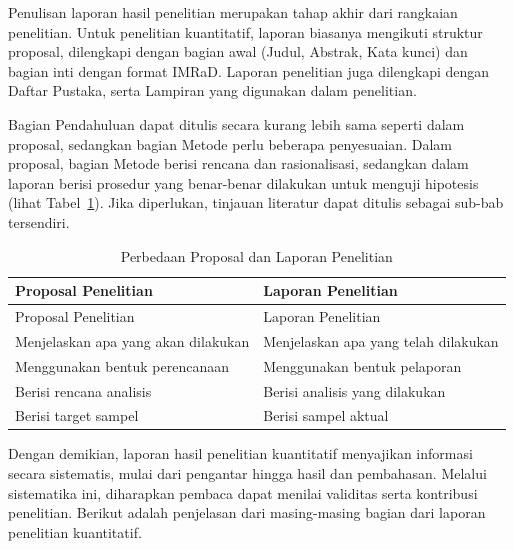 \documentclass[
  indonesian,
  letterpaper,
  DIV=11,
  numbers=noendperiod]{scrreprt}
\begin{document}
Penulisan laporan hasil penelitian merupakan tahap akhir dari rangkaian
penelitian. Untuk penelitian kuantitatif, laporan biasanya mengikuti
struktur proposal, dilengkapi dengan bagian awal (Judul, Abstrak, Kata
kunci) dan bagian inti dengan format IMRaD. Laporan penelitian juga
dilengkapi dengan Daftar Pustaka, serta Lampiran yang digunakan dalam
penelitian.

Bagian Pendahuluan dapat ditulis secara kurang lebih sama seperti dalam
proposal, sedangkan bagian Metode perlu beberapa penyesuaian. Dalam
proposal, bagian Metode berisi rencana dan rasionalisasi, sedangkan
dalam laporan berisi prosedur yang benar-benar dilakukan untuk menguji
hipotesis (lihat Tabel~\ref{tbl-propvlap}). Jika diperlukan, tinjauan
literatur dapat ditulis sebagai sub-bab tersendiri.

\begin{longtable}[]{@{}
  >{\raggedright\arraybackslash}p{}
  >{\raggedright\arraybackslash}p{}@{}}
\caption{Perbedaan Proposal dan Laporan
Penelitian}\label{tbl-propvlap}\tabularnewline
\toprule\noalign{}
\begin{minipage}[b]{\linewidth}\raggedright
Proposal Penelitian
\end{minipage} & \begin{minipage}[b]{\linewidth}\raggedright
Laporan Penelitian
\end{minipage} \\
\midrule\noalign{}
\endfirsthead
\toprule\noalign{}
\begin{minipage}[b]{\linewidth}\raggedright
Proposal Penelitian
\end{minipage} & \begin{minipage}[b]{\linewidth}\raggedright
Laporan Penelitian
\end{minipage} \\
\midrule\noalign{}
\endhead
\bottomrule\noalign{}
\endlastfoot
Menjelaskan apa yang akan dilakukan & Menjelaskan apa yang telah
dilakukan \\
Menggunakan bentuk perencanaan & Menggunakan bentuk pelaporan \\
Berisi rencana analisis & Berisi analisis yang dilakukan \\
Berisi target sampel & Berisi sampel aktual \\
\end{longtable}

Dengan demikian, laporan hasil penelitian kuantitatif menyajikan
informasi secara sistematis, mulai dari pengantar hingga hasil dan
pembahasan. Melalui sistematika ini, diharapkan pembaca dapat menilai
validitas serta kontribusi penelitian. Berikut adalah penjelasan dari
masing-masing bagian dari laporan penelitian kuantitatif.
\end{document}
